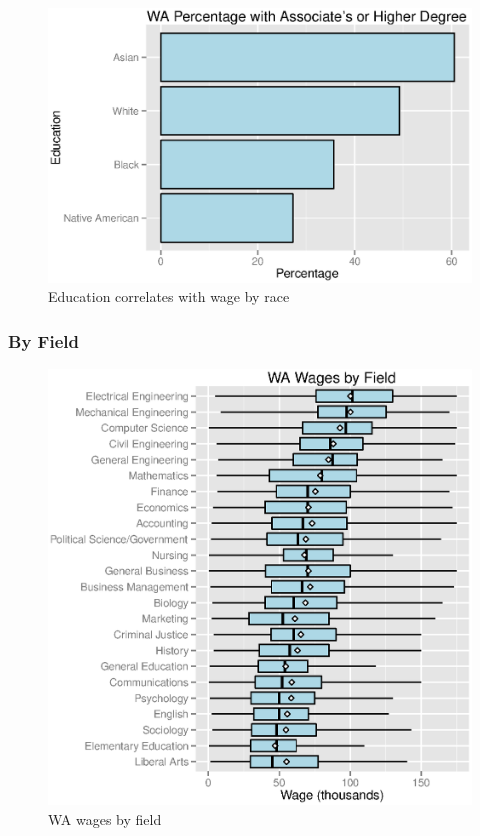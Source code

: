 \documentclass{exam}
\begin{document}
  \begin{figure}[H]
    \centering
    \includegraphics{figures/wa_degree_by_race.eps}
    \caption{Education correlates with wage by race}
  \end{figure}

  \subsubsection{By Field}
  \begin{figure}[H]
    \centering
    \includegraphics{figures/wa_wage_by_field.eps}
    \caption{WA wages by field}
  \end{figure}
\end{document}
